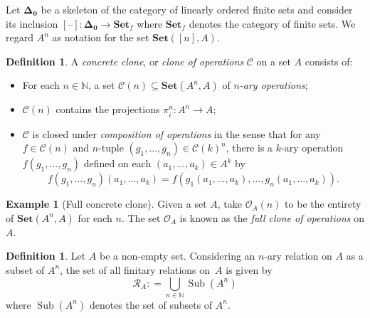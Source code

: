 \documentclass[11pt, a4paper, twoside,leqno]{amsart}
\newcommand{\cat}[1]{\mathbf{#1}}
\newcommand{\thg}{{\mathord{\text{--}}}}
\newcommand{\defeq}{\mathrel{\mathop:}=}
\renewcommand{\O}{{\mathcal O}}
\newcommand{\R}{{\mathcal R}}
\numberwithin{equation}{section}
\theoremstyle{plain}
\theoremstyle{definition}
\newtheorem{Defn}[Thm]{Definition}
\newtheorem{Ex}[Thm]{Example}
\newcommand{\Set}{\cat{Set}}
\DeclareMathOperator{\Sub}{Sub}
\begin{document}
Let \(\cat{\Delta_{0}}\) be a skeleton of the category of linearly
ordered finite
sets and consider its inclusion \([\thg] \colon
\cat{\Delta_{0}} \rightarrow \cat{Set}_{f}\) where \(\cat{Set}_{f}\) denotes
the category of finite sets. We regard \(A^{n}\) as notation for the set \(\Set([n],A)\).

\begin{Defn}
  \label{def:conc-clo}
  A \emph{concrete clone}, or  \emph{clone of operations} \(\mathscr{C}\) on a set \(A\) consists
  of:
  \begin{itemize}
  \item For each \(n\in \mathbb{N}
    \), a set \(\mathscr{C}(n) \subseteq \Set(A^{n},A)
    \) of \emph{\(n\)-ary operations};
  \item \(\mathscr{C}(n)\) contains the projections \(\pi_{i}^{n} \colon A^{n}
    \rightarrow A \);

  \item \(\mathscr{C}\) is closed under \emph{composition of operations} in the sense that
    for any \(f \in \mathscr{C}(n)
    \) and \(n\)-tuple \((g_{1},\dotsc,g_{n}) \in \mathscr{C}(k)^{n}
    \), there is a \(k\)-ary
    operation \(f(g_{1},\dots,g_{n})\)
    defined on each \((a_{1},\dotsc,a_{k})\in A^{k}\) by
    \begin{equation}
      \label{eq:15}
      f(g_{1},\dotsc,g_{n})(a_{1},\dotsc,a_{k}) = f(g_{1}(a_{1},\dotsc,a_{k}),\dotsc,g_{n}(a_{1},\dotsc,a_{k})).
    \end{equation}
  \end{itemize}
\end{Defn}

\begin{Ex}[Full concrete clone]
  \label{ex:full-cc}
  Given a set \(A\), take \(\mathscr{O}_{A}(n)\) to be the entirety of 
  \(\Set(A^{n},A)\) for each \(n\). 
  The set \(\mathscr{O}_{A}\) is known as the
  \emph{full clone of operations}
  on \(A\). 
\end{Ex}




\begin{Defn}
  \label{def:all-rels-on-set}
  Let \(A\) be a non-empty set. Considering an \(n\)-ary relation on \(A\) as a
  subset of \(A^{n}\), the set of all finitary relations on~\(A\) is
  given by
  \begin{equation*}
    \R_{A}\defeq \bigcup\limits_{n\in \mathbb{N}}
    \Sub(A^{n})
  \end{equation*}
  where \(\Sub(A^{n})\) denotes the set of subsets of \(A^{n}\).
\end{Defn}
\end{document}
